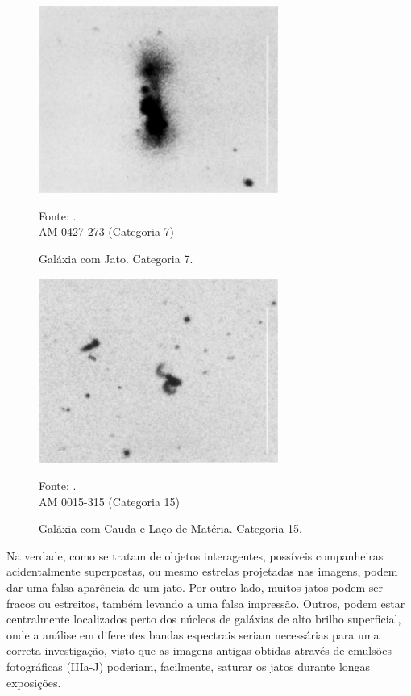 \begin{figure}[!htbp]
    \centering
    \caption{Galáxia com Jato. Categoria 7.}
    \includegraphics[width=0.7\textwidth]{figuras/2a_am0427-273.png}
   	\begin{center}
    \normalsize Fonte: \cite{arp1987catalogue}.\\AM 0427-273 (Categoria 7) 
    \end{center}
    \label{fig:galaxy-jet2}
\end{figure}

\begin{figure}[!htbp]
	\centering	
    \caption{Galáxia com Cauda e Laço de Matéria. Categoria 15.}
    \includegraphics[width=0.7\textwidth]{figuras/2b_AM_0015-315.png}
   	\begin{center}
        \normalsize  Fonte: \cite{arp1987catalogue}.\\AM 0015-315 (Categoria 15)
    \end{center}
	\label{fig:galaxy-jet3}
\end{figure}

Na verdade, como se tratam de objetos interagentes, possíveis companheiras acidentalmente superpostas, ou mesmo estrelas projetadas nas imagens, podem dar uma falsa aparência de um jato. Por outro lado, muitos jatos podem ser fracos ou estreitos, também levando a uma falsa impressão. Outros, podem estar centralmente localizados perto dos núcleos de galáxias de alto brilho superficial, onde a análise em diferentes bandas espectrais seriam necessárias para uma correta investigação, visto que as imagens antigas obtidas através de emulsões fotográficas (IIIa-J) poderiam, facilmente, saturar os jatos durante longas exposições.

